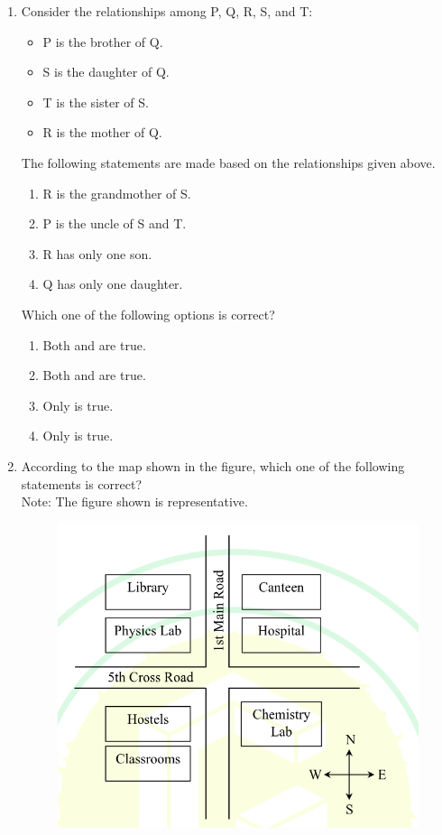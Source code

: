 \documentclass[a4paper, 11pt]{article}
\begin{document}
\begin{enumerate}
    \begin{enumerate}
    \end{enumerate}
    \hfill{}
    \item Consider the relationships among P, Q, R, S, and T:
    \begin{itemize}
        \item P is the brother of Q.
        \item S is the daughter of Q.
        \item T is the sister of S.
        \item R is the mother of Q.
    \end{itemize}
    The following statements are made based on the relationships given above.
    \begin{enumerate}[label=\brak{\arabic*}]
        \item R is the grandmother of S.
        \item P is the uncle of S and T.
        \item R has only one son.
        \item Q has only one daughter.
    \end{enumerate}
    Which one of the following options is correct?
    \begin{enumerate}
        \item Both  and  are true.
        \item Both  and  are true.
        \item Only  is true.
        \item Only  is true.
    \end{enumerate}
    \hfill{}
    \item According to the map shown in the figure, which one of the following statements is correct?\\Note: The figure shown is representative.
    \begin{figure}[H]
        \centering
        \includegraphics[width=0.6\columnwidth]{figs/q5.png}

\end{figure}
\end{enumerate}
\end{document}
